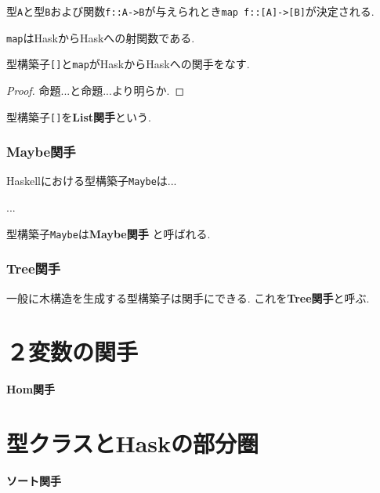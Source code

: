 型\verb|A|と型\verb|B|および関数\verb|f::A->B|が与えられとき\verb|map f::[A]->[B]|が決定される.
\begin{Prop}
\verb|map|はHaskからHaskへの射関数である.
\end{Prop}
\begin{Prop}
型構築子\verb|[]|と\verb|map|がHaskからHaskへの関手をなす.
\end{Prop}
\begin{proof}
命題...と命題...より明らか.
\end{proof}
型構築子\verb|[]|を{\bf List関手}という.
\subsubsection{Maybe関手}
Haskellにおける型構築子\verb|Maybe|は...

...

型構築子\verb|Maybe|は{\bf Maybe関手}
と呼ばれる.
\subsubsection{Tree関手}
一般に木構造を生成する型構築子は関手にできる. これを{\bf Tree関手}と呼ぶ.


\section{２変数の関手}
{\bf Hom関手}

\section{型クラスとHaskの部分圏}
{\bf ソート関手}

